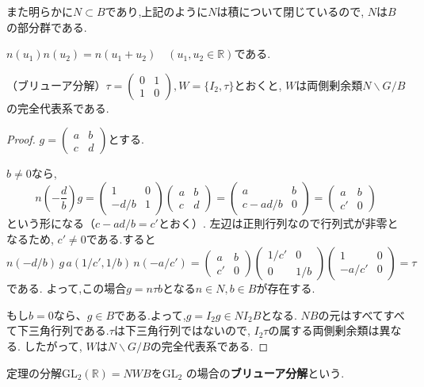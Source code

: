 また明らかに$N\subset B$であり,上記のように$N$は積について閉じているので,
$N$は$B$の部分群である.

$n(u_1)n(u_2)=n(u_1+u_2)\quad (u_1,u_2 \in \mathbb{R})$である.
\newline

\begin{tcolorbox}
	\begin{thm*}
		（ブリューア分解）$\tau=\begin{pmatrix}0&1\\1&0\end{pmatrix},
		W=\{I_2,\tau\}$とおくと,
		$W$は両側剰余類$N\backslash G/B$の完全代表系である.
	\end{thm*}
\end{tcolorbox}
\begin{proof}
	$g=\begin{pmatrix}a&b\\c&d\end{pmatrix}$とする.
	
	$b\neq 0$なら,
	\[n\left(-\frac{d}{b}\right)g
	=\begin{pmatrix}1&0\\-d/b&1 \end{pmatrix}
	\begin{pmatrix}a&b\\c&d\end{pmatrix}
	=\begin{pmatrix}a&b\\c-ad/b&0\end{pmatrix}
	=\begin{pmatrix}a&b\\c'&0\end{pmatrix}\]
	という形になる（$c-ad/b=c'$とおく）. 
	左辺は正則行列なので行列式が非零となるため, $c'\neq 0$である.すると
	\[n(-d/b)\,g\,a(1/c',1/b)\,n(-a/c')=
	\begin{pmatrix}	a&b\\c'&0 \end{pmatrix}
	\begin{pmatrix} 1/c'&0\\0&1/b \end{pmatrix}
	\begin{pmatrix} 1&0\\-a/c'&0 \end{pmatrix}=\tau\]
	である. よって,この場合$g=n\tau b$となる$n\in N, b \in B$が存在する.

	もし$b=0$なら、$g \in B$である.よって,$g=I_2g\in NI_2B$となる.
	$NB$の元はすべてすべて下三角行列である.$\tau$は下三角行列ではないので,
	$I_2\tau$の属する両側剰余類は異なる.
	したがって, $W$は$N\backslash G/B$の完全代表系である.
\end{proof}
定理の分解$\mathrm{GL}_2(\mathbb{R})=NWB$を$\mathrm{GL}_2$
の場合の\textbf{ブリューア分解}という.

